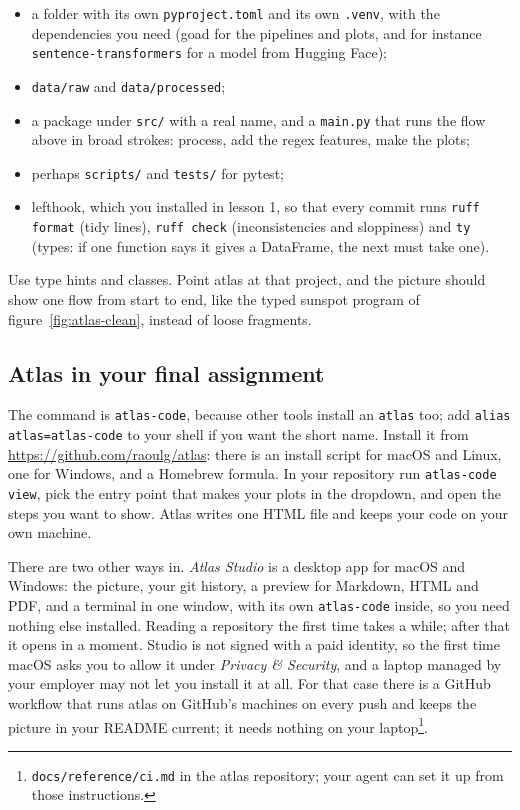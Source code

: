 \documentclass[12pt, a4paper]{article}
\theoremstyle{definition}
\theoremstyle{remark}
\begin{document}
\begin{itemize}
\item a folder with its own \texttt{pyproject.toml} and its own \texttt{.venv}, with the dependencies you need (goad for the pipelines and plots, and for instance \texttt{sentence-transformers} for a model from Hugging Face);
\item \texttt{data/raw} and \texttt{data/processed};
\item a package under \texttt{src/} with a real name, and a \texttt{main.py} that runs the flow above in broad strokes: process, add the regex features, make the plots;
\item perhaps \texttt{scripts/} and \texttt{tests/} for pytest;
\item lefthook, which you installed in lesson 1, so that every commit runs \texttt{ruff format} (tidy lines), \texttt{ruff check} (inconsistencies and sloppiness) and \texttt{ty} (types: if one function says it gives a DataFrame, the next must take one).
\end{itemize}

Use type hints and classes. Point atlas at that project, and the picture should show one flow from start to end, like the typed sunspot program of figure~\ref{fig:atlas-clean}, instead of loose fragments.

\subsection{Atlas in your final assignment}
\label{sec:atlas-assignment}
The command is \texttt{atlas-code}, because other tools install an \texttt{atlas} too; add \texttt{alias atlas=atlas-code} to your shell if you want the short name. Install it from \url{https://github.com/raoulg/atlas}: there is an install script for macOS and Linux, one for Windows, and a Homebrew formula. In your repository run \texttt{atlas-code view}, pick the entry point that makes your plots in the dropdown, and open the steps you want to show. Atlas writes one HTML file and keeps your code on your own machine.

There are two other ways in. \emph{Atlas Studio} is a desktop app for macOS and Windows: the picture, your git history, a preview for Markdown, HTML and PDF, and a terminal in one window, with its own \texttt{atlas-code} inside, so you need nothing else installed. Reading a repository the first time takes a while; after that it opens in a moment. Studio is not signed with a paid identity, so the first time macOS asks you to allow it under \emph{Privacy \& Security}, and a laptop managed by your employer may not let you install it at all. For that case there is a GitHub workflow that runs atlas on GitHub's machines on every push and keeps the picture in your README current; it needs nothing on your laptop\footnote{\texttt{docs/reference/ci.md} in the atlas repository; your agent can set it up from those instructions.}.
\end{document}
